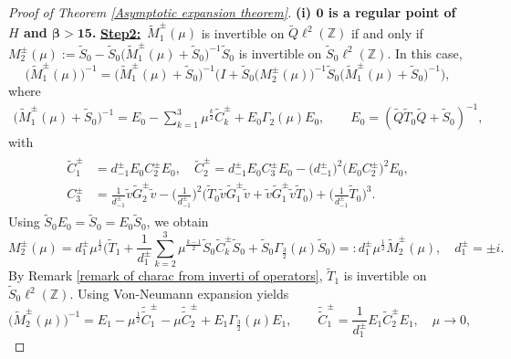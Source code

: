 \documentclass[10pt,a4paper]{amsart}
\newcommand\Z{\mathbb{Z}}
\numberwithin{equation}{section}
\begin{document}
\begin{proof}[Proof of Theorem {\rm\ref{Asymptotic expansion theorem}}]{\bf{(i) ${\bm{0}}$ is a regular point of $H$ and {$\bm{\beta>15}$}.}}
\vskip0.15cm
{\bf{\underline{Step2:}}}\ $\widetilde{M}_{1}^{\pm}(\mu)$ is invertible on $\widetilde{Q}\ell^{2}(\Z)$ if and only if $ M^{\pm}_{2}(\mu):=\widetilde{S}_0-\widetilde{S}_0\big(\widetilde{M}_{1}^{\pm}(\mu)+\widetilde{S}_0\big)^{-1}\widetilde{S}_0$ is invertible on $\widetilde{S}_0\ell^{2}(\Z)$. In this case,
\begin{equation}\label{Relat of M1 tuta and M2 at 2}
\big(\widetilde{M}_{1}^{\pm}(\mu)\big)^{-1}=\big(\widetilde{M}_{1}^{\pm}(\mu)+\widetilde{S}_0\big)^{-1}\Big(I+\widetilde{S}_0\big(M^{\pm}_{2}(\mu)\big)^{-1}\widetilde{S}_0\big(\widetilde{M}_{1}^{\pm}(\mu)+\widetilde{S}_0\big)^{-1}\Big),
\end{equation}
where
\begin{align*}
\big(\widetilde{M}_{1}^{\pm}(\mu)+\widetilde{S}_0\big)^{-1}=E_0-\sum\limits_{k=1}^{3}\mu^{\frac{k}{2}}\widetilde{C}^{\pm}_{k}+E_0\Gamma_{2}(\mu)E_0,\qquad E_0=(\widetilde{Q}\widetilde{T}_0\widetilde{Q}+\widetilde{S}_0)^{-1},
\end{align*}
with 
\begin{align}\label{Ctutak}
\begin{split}
\widetilde{C}^{\pm}_{1}&=d^{\pm}_{-1}E_0C^{\pm}_{2}E_0,\quad \widetilde{C}^{\pm}_{2}=d^{\pm}_{-1}E_0C^{\pm}_{3}E_0-\big(d^{\pm}_{-1}\big)^2\big(E_0C^{\pm}_2\big)^2E_0,\\
C^{\pm}_{3}&=\frac{1}{d^{\pm}_{-1}}\tilde{v}\widetilde{G}^{\pm}_2\tilde{v}-\Big(\frac{1}{d^{\pm}_{-1}}\Big)^2\Big(\widetilde{T}_0\tilde{v}\widetilde{G}^{\pm}_1\tilde{v}+\tilde{v}\widetilde{G}^{\pm}_1\tilde{v}\widetilde{T}_0\Big)+\Big(\frac{1}{d^{\pm}_{-1}}\widetilde{T}_0\Big)^3.
\end{split}
\end{align}
Using $\widetilde{S}_0E_0=\widetilde{S}_0=E_0\widetilde{S}_0$, we obtain
\begin{equation}\label{Relat of M2 and M2 tuta at 2}
M^{\pm}_2(\mu)=d^{\pm}_1\mu^{\frac{1}{2}}\Big(\widetilde{T}_1+\frac{1}{d^{\pm}_{1}}\sum\limits_{k=2}^{3}\mu^{\frac{k-1}{2}}\widetilde{S}_0\widetilde{C}_{k}^{\pm}\widetilde{S}_0+\widetilde{S}_0\Gamma_{\frac{3}{2}}(\mu)\widetilde{S}_0\Big)=:d^{\pm}_1\mu^{\frac{1}{2}}\widetilde{M}^{\pm}_2(\mu),\quad d^{\pm}_1=\pm i.
\end{equation}
By Remark \ref{remark of charac from inverti of operators}, $\widetilde{T}_1$ is invertible on $\widetilde{S}_0\ell^2(\Z)$. Using Von-Neumann expansion yields
\begin{equation}\label{inverse of Mtuta2}
\big(\widetilde{M}_{2}^{\pm}(\mu)\big)^{-1}=E_1-\mu^{\frac{1}{2}}\tilde{\tilde{C}}^{\pm}_{1}-\mu \tilde{\tilde{C}}^{\pm}_2+E_1\Gamma_{\frac{3}{2}}(\mu)E_1,\qquad \tilde{\tilde{C}}^{\pm}_{1}=\frac{1}{d^{\pm}_1}E_1\widetilde{C}^{\pm}_2E_1,\quad \mu\rightarrow0,

\end{equation}
\end{proof}
\end{document}
